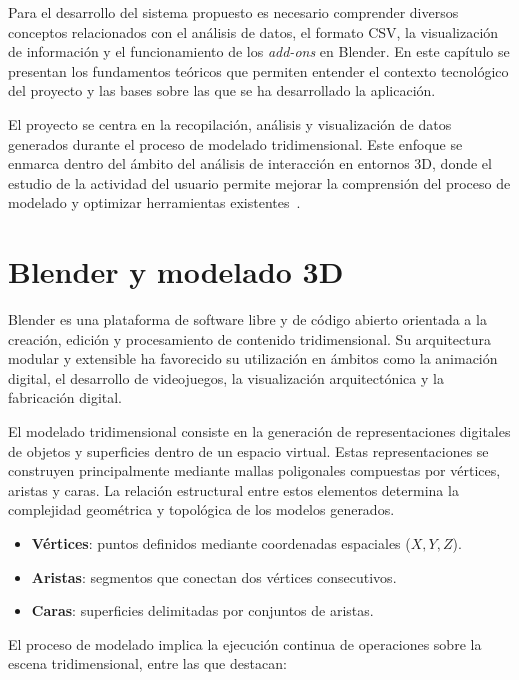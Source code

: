 
Para el desarrollo del sistema propuesto es necesario comprender diversos conceptos relacionados con el análisis de datos, el formato CSV, la visualización de información y el funcionamiento de los \textit{add-ons} en Blender. En este capítulo se presentan los fundamentos teóricos que permiten entender el contexto tecnológico del proyecto y las bases sobre las que se ha desarrollado la aplicación.

El proyecto se centra en la recopilación, análisis y visualización de datos generados durante el proceso de modelado tridimensional. Este enfoque se enmarca dentro del ámbito del análisis de interacción en entornos 3D, donde el estudio de la actividad del usuario permite mejorar la comprensión del proceso de modelado y optimizar herramientas existentes~\cite{gao2023,gao2021,jankowski2014,lavioila2017}.

\section{Blender y modelado 3D}

Blender es una plataforma de software libre y de código abierto orientada a la creación, edición y procesamiento de contenido tridimensional. Su arquitectura modular y extensible ha favorecido su utilización en ámbitos como la animación digital, el desarrollo de videojuegos, la visualización arquitectónica y la fabricación digital.

El modelado tridimensional consiste en la generación de representaciones digitales de objetos y superficies dentro de un espacio virtual. Estas representaciones se construyen principalmente mediante mallas poligonales compuestas por vértices, aristas y caras. La relación estructural entre estos elementos determina la complejidad geométrica y topológica de los modelos generados.

\begin{itemize}
\item \textbf{Vértices}: puntos definidos mediante coordenadas espaciales ($X, Y, Z$).
\item \textbf{Aristas}: segmentos que conectan dos vértices consecutivos.
\item \textbf{Caras}: superficies delimitadas por conjuntos de aristas.
\end{itemize}

El proceso de modelado implica la ejecución continua de operaciones sobre la escena tridimensional, entre las que destacan:

